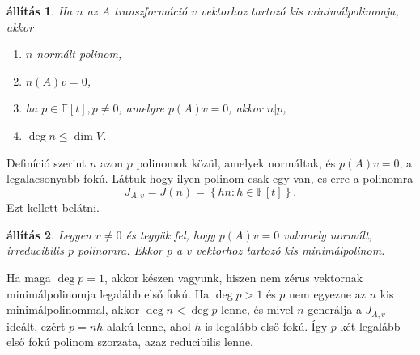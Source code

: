 \documentclass[9pt, a4paper, showtrims]{memoir}
\makeatletter
\renewenvironment{proof}[1][\proofname]
    {\par\pushQED{\qed}%
    \normalfont \topsep6\p@\@plus6\p@\relax
    \trivlist
    \item[\hskip\labelsep
        \itshape
    #1\@addpunct{:}]\ignorespaces}
    {\popQED\endtrivlist\@endpefalse}
\theoremstyle{plain}
\newtheorem{proposition}{állítás}[chapter]
\theoremstyle{remark}
\theoremstyle{definition}
\makeatother
\begin{document}
    \begin{proposition}
        Ha  $n$ az $A$ transzformáció $v$ vektorhoz tartozó kis minimálpolinomja,
        akkor
        \begin{enumerate}
            \item $n$ normált polinom,
            \item $n\left( A \right)v=0$,
            \item ha $p\in\mathbb{F}\left[ t \right], p\neq 0$, amelyre 
                $p\left( A \right)v=0$, akkor $n|p$,
            \item $\deg n\leq\dim V$.\qedhere
        \end{enumerate}
    \end{proposition}
    \begin{proof}
        Definíció szerint $n$ azon $p$ polinomok közül, 
        amelyek normáltak, és $p\left( A \right)v=0$, a legalacsonyabb fokú.
        Láttuk hogy ilyen polinom csak egy van, es erre a polinomra
        \[
            J_{A,v}=J\left( n \right)=\left\{ hn:h\in\mathbb{F}\left[ t \right] \right\}.
        \]
        Ezt kellett belátni. 
    \end{proof}
    \begin{proposition}
        Legyen $v\neq 0$ és tegyük fel, hogy $p\left( A \right)v=0$ valamely normált,
        irreducibilis $p$ polinomra.
        Ekkor $p$ a $v$ vektorhoz tartozó kis minimálpolinom.
    \end{proposition}
    \begin{proof}
        Ha maga $\deg p=1$, akkor készen vagyunk, hiszen nem zérus vektornak minimálpolinomja legalább első fokú.
        Ha $\deg p>1$ és $p$ nem egyezne az $n$ kis minimálpolinommal,
        akkor $\deg n<\deg p$ lenne, és mivel $n$ generálja a $J_{A,v}$ ideált,
        ezért $p=nh$ alakú lenne, ahol $h$ is legalább első fokú.
        Így $p$ két legalább első fokú polinom szorzata, azaz reducibilis lenne.
    \end{proof}
\end{document}
